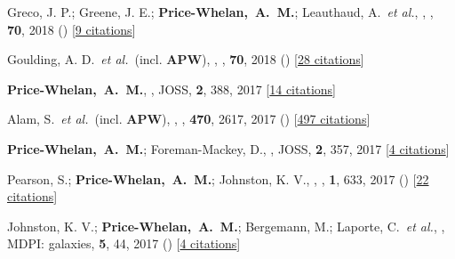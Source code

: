 \item[{\color{deemph}\scriptsize34}]Greco, J. P.; Greene, J. E.; \textbf{Price-Whelan,~A.~M.}; Leauthaud, A.~\textit{et al.}, , \pasj, \textbf{70}, 2018 () [\href{http://adsabs.harvard.edu/abs/2018PASJ...70S..19G}{9 citations}]

\item[{\color{deemph}\scriptsize33}]Goulding, A. D.~\textit{et al.}~(incl. \textbf{APW}), , \pasj, \textbf{70}, 2018 () [\href{http://adsabs.harvard.edu/abs/2018PASJ...70S..37G}{28 citations}]

\item[{\color{deemph}\scriptsize32}]\textbf{Price-Whelan,~A.~M.}, , JOSS, \textbf{2}, 388, 2017 [\href{http://adsabs.harvard.edu/abs/2017JOSS....2..388P}{14 citations}]

\item[{\color{deemph}\scriptsize31}]Alam, S.~\textit{et al.}~(incl. \textbf{APW}), , \mnras, \textbf{470}, 2617, 2017 () [\href{http://adsabs.harvard.edu/abs/2017MNRAS.470.2617A}{497 citations}]

\item[{\color{deemph}\scriptsize30}]\textbf{Price-Whelan,~A.~M.}; Foreman-Mackey, D., , JOSS, \textbf{2}, 357, 2017 [\href{http://adsabs.harvard.edu/abs/2017JOSS....2..357P}{4 citations}]

\item[{\color{deemph}\scriptsize29}]Pearson, S.; \textbf{Price-Whelan,~A.~M.}; Johnston, K. V., , \natureast, \textbf{1}, 633, 2017 () [\href{http://adsabs.harvard.edu/abs/2017NatAs...1..633P}{22 citations}]

\item[{\color{deemph}\scriptsize28}]Johnston, K. V.; \textbf{Price-Whelan,~A.~M.}; Bergemann, M.; Laporte, C.~\textit{et al.}, , MDPI: galaxies, \textbf{5}, 44, 2017 () [\href{http://adsabs.harvard.edu/abs/2017Galax...5...44J}{4 citations}]

